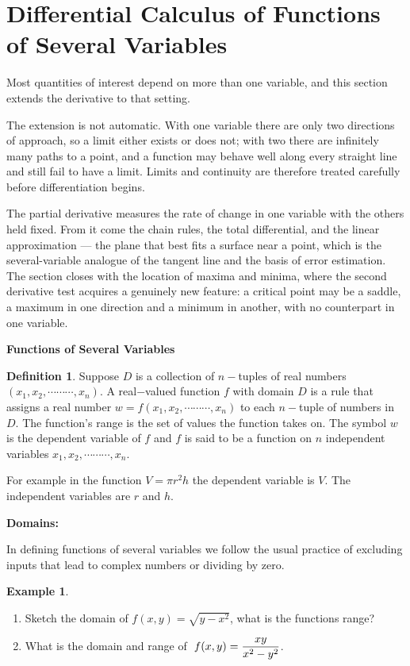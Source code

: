 \documentclass[11pt,a4paper]{article}
\theoremstyle{definition}
\newtheorem{defn}[thm]{Definition}
\newtheorem{exa}[thm]{Example}
\newcommand{\subhead}[1]{%
  \par\medskip\noindent\textbf{#1}\par\nobreak\smallskip}
\begin{document}
\section{Differential Calculus of Functions of Several Variables}

Most quantities of interest depend on more than one variable, and this section
extends the derivative to that setting.

The extension is not automatic. With one variable there are only two directions
of approach, so a limit either exists or does not; with two there are infinitely
many paths to a point, and a function may behave well along every straight line
and still fail to have a limit. Limits and continuity are therefore treated
carefully before differentiation begins.

The partial derivative measures the rate of change in one variable with the
others held fixed. From it come the chain rules, the total differential, and the
linear approximation --- the plane that best fits a surface near a point, which
is the several-variable analogue of the tangent line and the basis of error
estimation. The section closes with the location of maxima and minima, where the
second derivative test acquires a genuinely new feature: a critical point may be
a saddle, a maximum in one direction and a minimum in another, with no
counterpart in one variable.


\subhead{Functions of Several Variables}


\begin{defn}


Suppose $D$ is a collection of $n-$tuples of real numbers $(x_1,x_2,\cdots\cdots\cdots,x_n)$. A real$-$valued function $f$ with domain $D$ is a rule that assigns a real number $w = f(x_1,x_2,\cdots\cdots\cdots,x_n)$ to each $n-$tuple of numbers in $D$. The function's range is the set of values the function takes on. The symbol $w$ is the dependent variable of $f$ and $f$ is said to be a function on $n$ independent variables $x_1, x_2,\cdots\cdots\cdots, x_n$.


For example in the function $V = \pi r^2 h$ the dependent variable is $V$. The independent variables are $r$ and $h$.
\end{defn}


\subhead{Domains:}


In defining functions of several variables we follow the usual practice of excluding inputs that lead to complex numbers or dividing by zero.


\begin{exa}
\begin{enumerate}
\item Sketch the domain of $f(x,y) = \sqrt{y - x^2}$, what is the functions range?
\item What is the domain and range of $\hspace{0.1cm} f(x,y) = \dfrac{xy}{x^2 - y^2}$.
\end{enumerate}
\end{exa}
\end{document}
